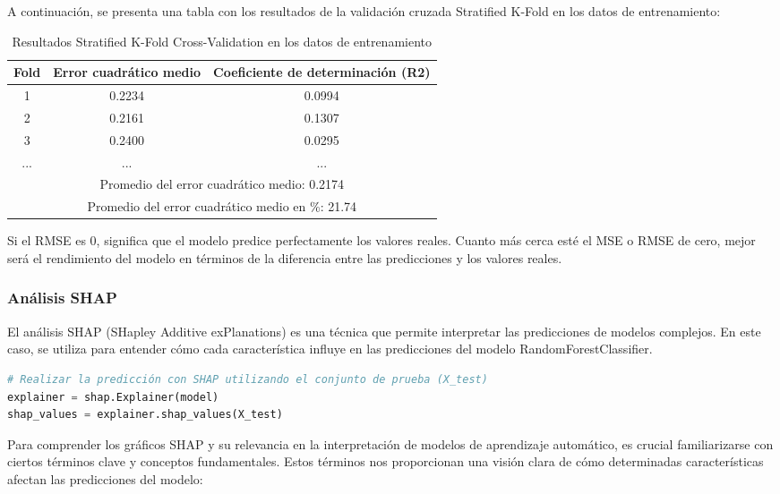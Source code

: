 A continuación, se presenta una tabla con los resultados de la validación cruzada Stratified K-Fold en los datos de entrenamiento:

\begin{table}[h]
\centering
\caption{Resultados Stratified K-Fold Cross-Validation en los datos de entrenamiento}
\label{lst:res_skfold_train}
\begin{tabular}{|c|c|c|}
\hline
\textbf{Fold} & \textbf{Error cuadrático medio} & \textbf{Coeficiente de determinación (R2)} \\
\hline
1 & 0.2234 & 0.0994 \\
2 & 0.2161 & 0.1307 \\
3 & 0.2400 & 0.0295 \\
... & ... & ... \\
\hline
\multicolumn{3}{|c|}{Promedio del error cuadrático medio: 0.2174} \\
\multicolumn{3}{|c|}{Promedio del error cuadrático medio en \%: 21.74} \\
\hline
\end{tabular}
\end{table}

Si el RMSE es 0, significa que el modelo predice perfectamente los valores reales. Cuanto más cerca esté el MSE o RMSE de cero, mejor será el rendimiento del modelo en términos de la diferencia entre las predicciones y los valores reales.


\subsubsection{Análisis SHAP}

El análisis SHAP (SHapley Additive exPlanations) es una técnica que permite interpretar las predicciones de modelos complejos. En este caso, se utiliza para entender cómo cada característica influye en las predicciones del modelo RandomForestClassifier.

\begin{lstlisting}[language=Python, caption=Predicción con SHAP utilizando el conjunto de prueba, label=lst:shap_analysis]
# Realizar la predicción con SHAP utilizando el conjunto de prueba (X_test)
explainer = shap.Explainer(model)
shap_values = explainer.shap_values(X_test)
\end{lstlisting}


Para comprender los gráficos SHAP y su relevancia en la interpretación de modelos de aprendizaje automático, es crucial familiarizarse con ciertos términos clave y conceptos fundamentales. Estos términos nos proporcionan una visión clara de cómo determinadas características afectan las predicciones del modelo:

